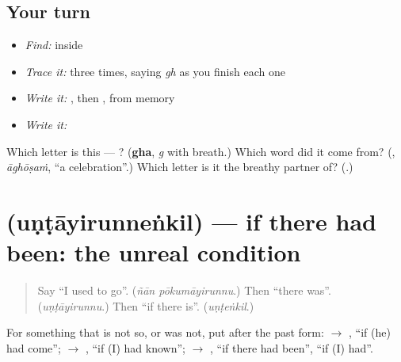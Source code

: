 \subsection*{Your turn}
\begin{itemize}
\raggedright
  \item \emph{Find:}  inside \textbf{}
  \item \emph{Trace it:}  three times, saying \emph{gh} as you finish each one
  \item \emph{Write it:} , then , from memory
  \item \emph{Write it:} \textbf{}
\end{itemize}

\begin{tcolorbox}[breakable,colback=teal!4,colframe=teal!35!black,title={Before you move on}]
Which letter is this — ? (\textbf{gha}, \emph{g} with breath.) Which word did it come from? (\textbf{}, \emph{āghōṣaṁ}, \textquotedblleft{}a celebration\textquotedblright{}.) Which letter is it the breathy partner of? (\textbf{}.)
\end{tcolorbox}
\section[\texorpdfstring{\ml{പണം} … (paṇaṁ …)}{പണം … (paṇaṁ …)}]{ (uṇṭāyirunneṅkil) — if there had been: the unreal condition}

\label{lesson:ML-C348-undayirunnenkil}



\begin{quote}
Say \textquotedblleft{}I used to go\textquotedblright{}. (\emph{ñān pōkumāyirunnu}.) Then \textquotedblleft{}there was\textquotedblright{}. (\emph{uṇṭāyirunnu}.) Then \textquotedblleft{}if there is\textquotedblright{}. (\emph{uṇṭeṅkil}.)
\end{quote}

\begin{grammarlens}[title={Grammar Lens: -\ml{ഇരുന്നെങ്കിൽ}, if only it had been so}]
For something that is not so, or was not, put \textbf{} after the past form: \textbf{} $\to$ \textbf{}, \textquotedblleft{}if (he) had come\textquotedblright{}; \textbf{} $\to$ \textbf{}, \textquotedblleft{}if (I) had known\textquotedblright{}; \textbf{} $\to$ \textbf{}, \textquotedblleft{}if there had been\textquotedblright{}, \textquotedblleft{}if (I) had\textquotedblright{}.
\end{grammarlens}

